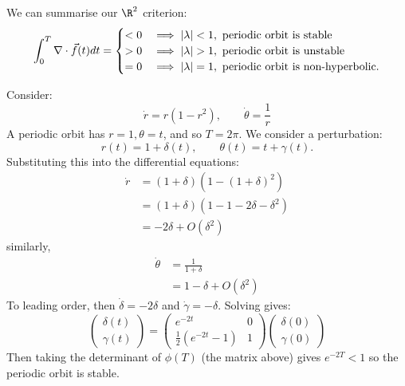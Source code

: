 \documentclass[../Main.tex]{subfiles}
\begin{document}
We can summarise our $\R^2$ criterion:
\begin{equation*}
    \int_{0}^{T} \nabla \cdot \vec f(t) dt =
    \begin{cases}
        < 0 & \implies \left|\lambda\right| < 1,\text{ periodic orbit is stable} \\
        > 0 & \implies \left|\lambda\right| > 1,\text{ periodic orbit is unstable} \\
        = 0 & \implies \left|\lambda\right| = 1,\text{ periodic orbit is non-hyperbolic.}
    \end{cases}
\end{equation*}
\begin{example}
    Consider:
    \begin{equation*}
        \dot{r} = r(1-r^2),\qquad\dot\theta = \frac1r
    \end{equation*}
    A periodic orbit has $r = 1, \theta = t$, and so $T = 2\pi$. We consider a perturbation:
    \begin{equation*}
        r(t) = 1 + \delta(t),\qquad \theta(t) = t + \gamma(t).
    \end{equation*}
    Substituting this into the differential equations:
    \begin{align*}
        \dot{r} &= (1 + \delta)(1 - (1 + \delta)^2) \\
        &= (1 + \delta)(1 - 1 - 2\delta - \delta^2) \\
        &= -2\delta + O(\delta^2)
    \end{align*}
    similarly,
    \begin{align*}
        \dot\theta &= \frac{1}{1 + \delta} \\
        &= 1 - \delta + O(\delta^2)
    \end{align*}
    To leading order, then $\dot\delta = -2\delta$ and $\dot\gamma = -\delta$. Solving gives:
    \begin{equation*}
        \begin{pmatrix}\delta(t) \\ \gamma(t)\end{pmatrix} =
        \begin{pmatrix}
            e^{-2t} & 0 \\
            \frac12(e^{-2t} - 1) & 1
        \end{pmatrix}
        \begin{pmatrix}\delta(0) \\ \gamma(0)\end{pmatrix}
    \end{equation*}
    Then taking the determinant of $\phi(T)$ (the matrix above) gives $e^{-2T} < 1$ so the periodic orbit is stable.
\end{example}
\end{document}

